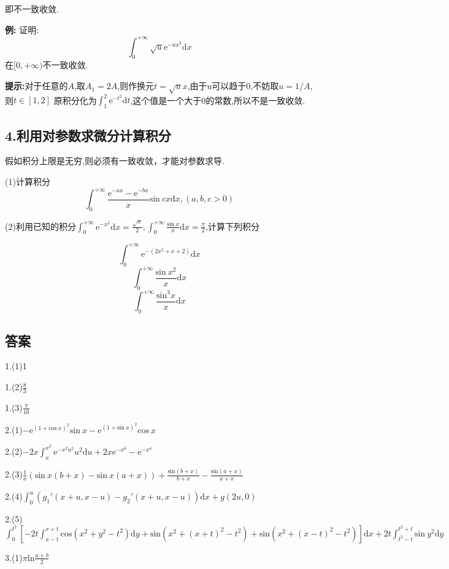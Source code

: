 \documentclass{ctexart}
\begin{document}
即不一致收敛.

\textbf{例:} 证明:$$\int_{0}^{+\infty}\sqrt{u}\mathrm{e}^{-ux^{2}}\mathrm{d}x$$在$[0,+\infty)$不一致收敛.

\textbf{提示:}对于任意的$A$,取$A_{1}=2A$,则作换元$t=\sqrt{u}x$,由于u可以趋于0,不妨取$u=1/A$,则$t\in[1,2]$
原积分化为$\int_{1}^{2}\mathrm{e}^{-t^{2}}\mathrm{d}t$,这个值是一个大于0的常数,所以不是一致收敛.

\subsection*{4.利用对参数求微分计算积分}

假如积分上限是无穷,则必须有一致收敛，才能对参数求导.

(1)计算积分$$\int_{0}^{+\infty}\frac{\mathrm{e}^{-ax}-\mathrm{e}^{-bx}}{x}\mathrm{sin}\ cx\mathrm{d}x,(a,b,c>0)$$

(2)利用已知的积分$\int_{0}^{+\infty}\mathrm{e}^{-x^{2}}\mathrm{d}x=\frac{\sqrt{\pi}}{2},\int_{0}^{+\infty}\frac{\mathrm{sin}\ x}{x}\mathrm{d}x=\frac{\pi}{2}$,计算下列积分

$$\int_{0}^{+\infty}\mathrm{e}^{-(2x^{2}+x+2)}\mathrm{d}x$$
$$\int_{0}^{+\infty}\frac{\mathrm{sin}\ x^{2}}{x}\mathrm{d}x$$
$$\int_{0}^{+\infty}\frac{\mathrm{sin}^{3}x}{x}\mathrm{d}x$$
\newpage
\subsection*{答案}
1.(1)1

1.(2)$\frac{8}{3}$

1.(3)$\frac{\pi}{16}$

2.(1)$-\mathrm{e}^{(1+\mathrm{cos}\ x)^{2}}\mathrm{sin}\ x-\mathrm{e}^{(1+\mathrm{sin}\ x)^{2}}\mathrm{cos}\ x$

2.(2)$-2x\int_{x}^{x^{2}}\mathrm{e}^{-x^{2}u^{2}}u^{2}\mathrm{d}u+2x\mathrm{e}^{-x^{6}}-\mathrm{e}^{-x^{4}}$

2.(3)$\frac{1}{x}(\mathrm{sin}\ x(b+x)-\mathrm{sin}\ x(a+x))+\frac{\mathrm{sin}(b+x)}{b+x}-\frac{\mathrm{sin}(a+x)}{a+x}$

2.(4)$\int_{0}^{u}(g_{1}'(x+u,x-u)-g_{2}'(x+u,x-u))\mathrm{d}x+g(2u,0)$

2.(5)$\int^{t^{2}}_{0}[-2t\int_{x-t}^{x+t}\mathrm{cos}(x^{2}+y^{2}-t^{2})\mathrm{d}y+\mathrm{sin}(x^{2}+(x+t)^{2}-t^{2})+\mathrm{sin}(x^{2}+(x-t)^{2}-t^{2})]\mathrm{d}x
+2t\int_{t^{2}-t}^{t^{2}+t}\mathrm{sin}\ y^{2}\mathrm{d}y$

3.(1)$\pi \mathrm{ln}\frac{a+b}{2}$
\end{document}

